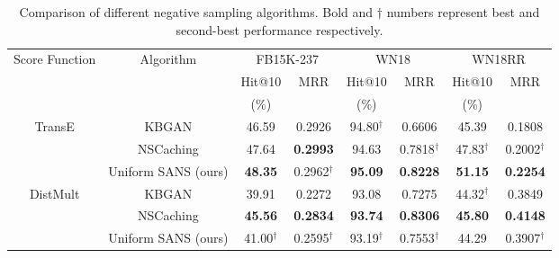 \begin{table*}[h]
\begin{small}
\centering
\begin{tabular}{cccccccc}
\hline
\multirow{3}{2cm}{\centering Score Function}& \multirow{3}{2cm}{Algorithm} & \multicolumn{2}{c}{FB15K-237} & \multicolumn{2}{c}{WN18} & \multicolumn{2}{c}{WN18RR} \\
& & Hit@10 & \multirow{2}{1cm}{\centering MRR} & Hit@10 & \multirow{2}{1cm}{\centering MRR} & Hit@10 & \multirow{2}{1cm}{\centering MRR} \\ 
& & (\%) & & (\%) & & (\%) & \\
\hline
\multirow{3}{1.5cm}{\centering TransE} & KBGAN \cite{cai2017kbgan} & 46.59 & 0.2926 & 94.80$^\dagger$ & 0.6606 & 45.39 & 0.1808 \\
& NSCaching \cite{zhang2019nscaching} & 47.64 & \textbf{0.2993} & 94.63 & 0.7818$^\dagger$ & 47.83$^\dagger$ & 0.2002$^\dagger$ \\
&Uniform SANS (ours) & \textbf{48.35} & 0.2962$^\dagger$ & \textbf{95.09} & \textbf{0.8228} & \textbf{51.15} & \textbf{0.2254} \\
\hline
\multirow{3}{1.5cm}{\centering DistMult} & KBGAN & 39.91 & 0.2272 & 93.08 & 0.7275 & 44.32$^\dagger$ & 0.3849 \\
& NSCaching & \textbf{45.56} & \textbf{0.2834} & \textbf{93.74} & \textbf{0.8306} & \textbf{45.80} & \textbf{0.4148} \\
& Uniform SANS (ours) & 41.00$^\dagger$ & 0.2595$^\dagger$ & 93.19$^\dagger$ & 0.7553$^\dagger$ & 44.29 & 0.3907$^\dagger$ \\
\hline
\end{tabular}
\caption{Comparison of different negative sampling algorithms.
Bold and $\dagger$ numbers represent best and second-best performance respectively.
}
\label{tab:comp_sota}
\end{small}
\end{table*}
